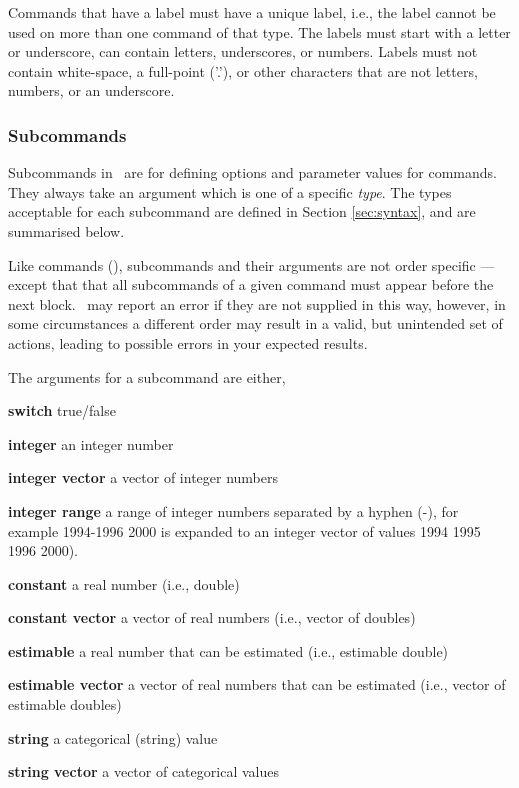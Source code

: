 Commands that have a label must have a unique label, i.e., the label cannot be used on more than one command of that type. The labels must start with a letter or underscore, can contain letters, underscores, or numbers. Labels must not contain white-space, a full-point ('.'), or other characters that are not letters, numbers, or an underscore.

\subsubsection{Subcommands}

Subcommands in \SPM\ are for defining options and parameter values for commands. They always take an argument which is one of a specific \emph{type}. The types acceptable for each subcommand are defined in Section \ref{sec:syntax}, and are summarised below. 

Like commands (), subcommands and their arguments are not order specific --- except that that all subcommands of a given command must appear before the next  block. \SPM\ may report an error if they are not supplied in this way, however, in some circumstances a different order may result in a valid, but unintended set of actions, leading to possible errors in your expected results.  

The arguments for a subcommand are either,

\begin{description}
\item \textbf{switch} true/false 
\item \textbf{integer} an integer number
\item \textbf{integer vector} a vector of integer numbers
\item \textbf{integer range} a range of integer numbers separated by a hyphen (-), for example 1994-1996 2000 is expanded to an integer vector of values 1994 1995 1996 2000). 
\item \textbf{constant} a real number (i.e., double)
\item \textbf{constant vector} a vector of real numbers (i.e., vector of doubles)
\item \textbf{estimable} a real number that can be estimated (i.e., estimable double)
\item \textbf{estimable vector} a vector of real numbers that can be estimated (i.e., vector of estimable doubles)
\item \textbf{string} a categorical (string) value
\item \textbf{string vector} a vector of categorical values
\end{description}

